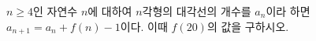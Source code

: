$n\ge4$인 자연수 $n$에 대하여 $n$각형의 대각선의 개수를 $a_n$이라 하면 $a_{n+1}=a_n+f(n)-1$이다. 이때 $f(20)$의 값을 구하시오.
\par\smallskip\begin{center}\resizebox{\ifdim\width>\linewidth\linewidth\else\width\fi}{!}{}\end{center}
